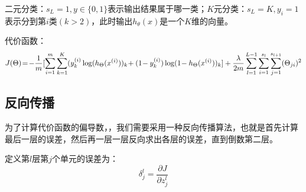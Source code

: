 \documentclass[cn,hazy,blue,normal,14pt]{elegantnote}
\begin{document}
二元分类：$s_L=1,y\in \{0,1\}$表示输出结果属于哪一类；$K$元分类：$s_L=K,y_i=1$表示分到第$i$类$(k>2)$，此时输出$h_\theta(x)$是一个$K$维的向量。

代价函数：
$$
    J(\Theta)\!=\!-\frac{1}{m}[\sum_{i=1}^{m}\sum_{k=1}^{K}(y_k ^{(i)}\log(h_\Theta(x ^{(i)}))_k\!+(1\!-y_k ^{(i)})\log(1\!-h_\Theta(x ^{(i)}))_k]\!\newline+\frac{\lambda}{2m}\sum_{l=1}^{L-1}\sum_{i=1}^{s_l}\sum_{j=1}^{s_{l+1}}(\Theta_{ji})^2
$$

\subsection{反向传播}
为了计算代价函数的偏导数，，我们需要采用一种反向传播算法，也就是首先计算最后一层的误差，然后再一层一层反向求出各层的误差，直到倒数第二层。

\begin{definition}
定义第$l$层第$j$个单元的误差为：
$$
\delta_j^l=\frac{\partial J}{\partial z_j^l}
$$
\end{definition}
\end{document}
